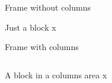 \documentclass[t]{beamer}
\begin{document}
\begin{frame}{Frame without columns}
  \begin{block}{Just a block}
  x
  \end{block}
\end{frame}

\begin{frame}{Frame with columns}
  \begin{columns}[t, onlytextwidth]
    \begin{column}{0.45\textwidth}
        \vspace*{-\baselineskip}
      \begin{block}{A block in a columns area}
      x
      \end{block}
    \end{column}
  \end{columns}
\end{frame}
\end{document}
